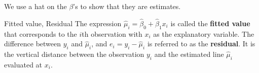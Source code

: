 \begin{Remark}{}{}
    We use a hat on the $ \beta $'s to show that they are estimates.
\end{Remark}
\begin{Definition}{Fitted value, Residual}{}
    The expression
    $ \hat{\mu}_i=\hat{\beta}_0+\hat{\beta}_1x_i $
    is called the \textbf{fitted value}
    that corresponds to the $ i $th observation
    with $ x_i $ as the explanatory variable.
    The difference between $ y_i $ and $ \hat{\mu}_i $,
    and $ e_i=y_i-\hat{\mu}_i $ is referred
    to as the \textbf{residual}. It is
    the vertical distance between the observation $ y_i $
    and the estimated line $ \hat{\mu}_i $
    evaluated at $ x_i $.
\end{Definition}
